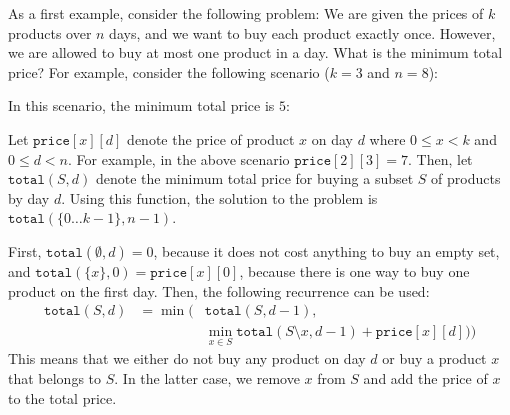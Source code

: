 As a first example, consider the following problem:
We are given the prices of $k$ products
over $n$ days, and we want to buy each product
exactly once.
However, we are allowed to buy at most one product
in a day.
What is the minimum total price?
For example, consider the following scenario ($k=3$ and $n=8$):
\begin{center}
\end{center}
In this scenario, the minimum total price is $5$:
\begin{center}
\end{center}

Let $\texttt{price}[x][d]$ denote the price of product $x$
on day $d$ where $0 \le x < k$ and $0 \le d < n$.
For example, in the above scenario $\texttt{price}[2][3] = 7$.
Then, let $\texttt{total}(S,d)$ denote the minimum total
price for buying a subset $S$ of products by day $d$.
Using this function, the solution to the problem is
$\texttt{total}(\{0 \ldots k-1\},n-1)$.

First, $\texttt{total}(\emptyset,d) = 0$,
because it does not cost anything to buy an empty set,
and $\texttt{total}(\{x\},0) = \texttt{price}[x][0]$,
because there is one way to buy one product on the first day.
Then, the following recurrence can be used:
\begin{equation*}
\begin{aligned}
\texttt{total}(S,d) & = \min( & \texttt{total}(S,d-1), \\
& & \min_{x \in S} \texttt{total}(S \setminus x,d-1)+\texttt{price}[x][d]))
\end{aligned}
\end{equation*}
This means that we either do not buy any product on day $d$
or buy a product $x$ that belongs to $S$.
In the latter case, we remove $x$ from $S$ and add the
price of $x$ to the total price.

